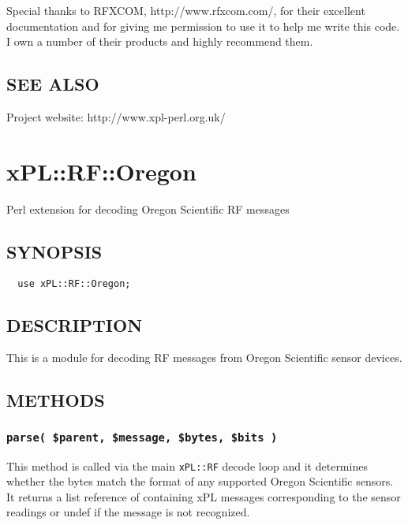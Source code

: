 \documentclass[12pt,a4paper]{article}
\begin{document}
Special thanks to RFXCOM, \textsf{http://www.rfxcom.com/}, for their
excellent documentation and for giving me permission to use it to help
me write this code.  I own a number of their products and highly
recommend them.

\subsection*{SEE ALSO\label{xPL::RF::HomeEasy_SEE_ALSO}}


Project website: http://www.xpl-perl.org.uk/

\newpage
\section{xPL::RF::Oregon\label{xPL::RF::Oregon}}


Perl extension for decoding Oregon Scientific RF messages

\subsection*{SYNOPSIS\label{xPL::RF::Oregon_SYNOPSIS}}
\begin{verbatim}
  use xPL::RF::Oregon;
\end{verbatim}
\subsection*{DESCRIPTION\label{xPL::RF::Oregon_DESCRIPTION}}


This is a module for decoding RF messages from Oregon Scientific
sensor devices.

\subsection*{METHODS\label{xPL::RF::Oregon_METHODS}}
\subsubsection*{\texttt{parse( \$parent, \$message, \$bytes, \$bits )}\label{xPL::RF::Oregon_parse_parent_message_bytes_bits_}}


This method is called via the main \texttt{xPL::RF} decode loop and it
determines whether the bytes match the format of any supported Oregon
Scientific sensors.  It returns a list reference of containing xPL
messages corresponding to the sensor readings or undef if the message
is not recognized.
\end{document}
